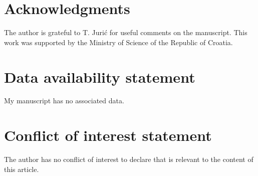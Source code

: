 \documentclass[12pt]{article}
\begin{document}
\section*{Acknowledgments}

The author is grateful to T. Juri\'c for useful comments on the manuscript.
This work was supported by the Ministry of Science of the Republic of Croatia.

\section*{Data availability statement}

My manuscript has no associated data.

\section*{Conflict of interest statement}

The author has no conflict of interest to declare that is relevant to the content of this article.
\end{document}
